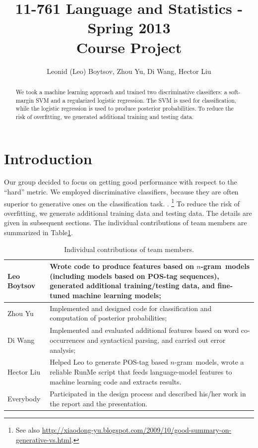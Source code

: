 \documentclass[11pt]{article}
\newcommand{\ngram}{\mbox{$n$-gram }}
\begin{document}
\title{11-761 Language and Statistics - Spring 2013\\
Course Project}
\author{Leonid (Leo) Boytsov, Zhou Yu, Di Wang, Hector Liu}
\date{}
\maketitle

\begin{abstract}
We took a machine learning approach and trained two discriminative classifiers:
a soft-margin SVM and a regularized logistic regression.
The SVM is used for classification, while the logistic regression is used to produce posterior probabilities.
To reduce the risk of overfitting, we generated additional training and testing data.
\end{abstract}

\section{Introduction}
Our group decided to focus on getting good performance with respect to the ``hard'' metric.
We employed discriminative classifiers,
because they are often superior to generative ones on the classification task. \cite{bishop2007generative,roni2013}.
\footnote{See also \url{http://xiaodong-yu.blogspot.com/2009/10/good-summary-on-generative-vs.html}.}
To reduce the risk of overfitting, we generate additional training data and testing data.
The details are given in subsequent sections. The individual contributions of team members are summarized in Table\ref{TableContrib}.

\begin{table}[H]
\begin{tabular}{p{1in}|p{5in}}
\hline
Leo Boytsov &  Wrote code to produce features based on \ngram models (including models based on POS-tag sequences), generated additional training/testing data, and fine-tuned machine learning models;
\\\hline
Zhou Yu & Implemented and designed code for classification and computation of posterior probabilities;
\\\hline
Di Wang & Implemented and evaluated additional features based on word co-occurrences and syntactical parsing, and
carried out error analysis;
\\\hline
Hector Liu & Helped Leo to generate POS-tag based \ngram models, wrote a
reliable RunMe script that feeds language-model features to machine learning code
and extracts results.
\\\hline
Everybody & Participated in the design process and described his/her work
in the report and the presentation.
\\\hline
\end{tabular}

\caption{\label{TableContrib}Individual contributions of team members.}
\end{table}
\end{document}
